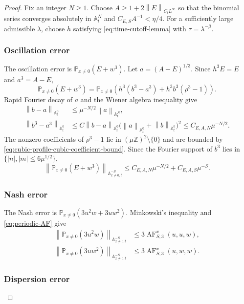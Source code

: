\documentclass[12pt,reqno,letterpaper]{amsart}
\numberwithin{equation}{section}
\theoremstyle{definition}
\newcommand{\Z}{\mathbb Z}
\newcommand{\A}{\mathbb A}
\newcommand{\la}{\lambda}
\newcommand{\norm}[1]{\left\lVert #1\right\rVert}
\newcommand{\abs}[1]{\left\lvert #1\right\rvert}
\begin{document}
\begin{proof}
Fix an integer $N\geq1$.  Choose
$A\geq1+2\norm E_{C_tL^\infty}$ so that the binomial series converges
absolutely in $\A_t^N$ and $C_{E,S}A^{-1}<\eta/4$.  For a sufficiently
large admissible $\la$, choose $h$ satisfying
\eqref{eq:time-cutoff-lemma} with $\tau=\la^{-\beta}$.

\subsubsection*{Oscillation error}

The oscillation error is $\mathbb P_{x\neq0}(E+w^3)$.  Let
$a=(A-E)^{1/3}$.  Since $h^3E=E$ and $a^3=A-E$,
\begin{equation*}
 \mathbb P_{x\neq0}(E+w^3)
 =\mathbb P_{x\neq0}\left(
 h^3(b^3-a^3)+h^3b^3(\rho^3-1)\right).
\end{equation*}
Rapid Fourier decay of $a$ and the Wiener algebra inequality give
\begin{align*}
 \norm{b-a}_{\A^0_t}
 &\leq \mu^{-N/2}\norm a_{\A^N_t},\\
 \norm{b^3-a^3}_{\A^0_t}
 &\leq C\norm{b-a}_{\A^0_t}
   \bigl(\norm a_{\A^0_t}+\norm b_{\A^0_t}\bigr)^2
 \leq C_{E,A,N}\mu^{-N/2}.
\end{align*}
The nonzero coefficients of $\rho^3-1$ lie in
$(\mu\Z)^2\setminus\{0\}$ and are bounded by
\eqref{eq:cubic-profile-cubic-coefficient-bound}.  Since the Fourier support of
$b^3$ lies in $\{\abs n,\abs m\leq6\mu^{1/2}\}$,
\begin{equation*}
 \norm{\mathbb P_{x\neq0}(E+w^3)}_{\A^{-S}_{x\neq0,t}}
 \leq C_{E,A,N}\mu^{-N/2}+C_{E,A,S}\mu^{-S}.
\end{equation*}

\subsubsection*{Nash error}

The Nash error is $\mathbb P_{x\neq0}(3u^2w+3uw^2)$.
Minkowski's inequality and \eqref{eq:periodic-AF}
give
\begin{align*}
 \norm{\mathbb P_{x\neq0}(3u^2w)}_{\A^{-S}_{x\neq0,t}}
 &\leq3\operatorname{AF}_{S,3}^x(u,u,w),\\
 \norm{\mathbb P_{x\neq0}(3uw^2)}_{\A^{-S}_{x\neq0,t}}
 &\leq3\operatorname{AF}_{S,3}^x(u,w,w).
\end{align*}

\subsubsection*{Dispersion error}


\end{proof}
\end{document}
